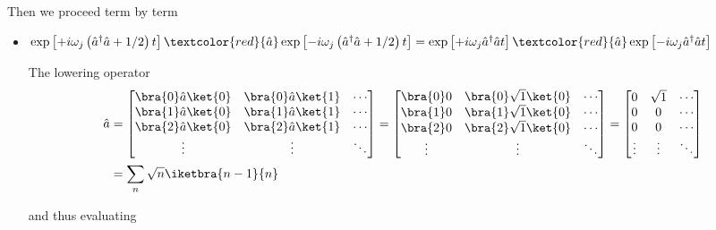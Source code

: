 \noindent Then we proceed term by term
\begin{itemize}
\item
  $\exp\left[+i\omega_j\left(\hat{a}^\dagger\hat{a}+{1}/{2}\right)t\right]\textcolor{red}{\hat{a}}\exp\left[-i\omega_j\left(\hat{a}^\dagger\hat{a}+{1}/{2}\right)t\right]
  =
  \exp\left[+i\omega_j\hat{a}^\dagger\hat{a}t\right]\textcolor{red}{\hat{a}}\exp\left[-i\omega_j\hat{a}^\dagger\hat{a}t\right]$

  The lowering operator \textcolor{red}{
    \begin{equation}
      \begin{aligned}
        \hat{a} & =
        \begin{bmatrix}
          \bra{0}\hat{a}\ket{0} & \bra{0}\hat{a}\ket{1} & \cdots\\
          \bra{1}\hat{a}\ket{0} & \bra{1}\hat{a}\ket{1} & \cdots\\
          \bra{2}\hat{a}\ket{0} & \bra{2}\hat{a}\ket{1} & \cdots\\
          \vdots & \vdots & \ddots\\
        \end{bmatrix}
        = \begin{bmatrix}
          \bra{0}0 & \bra{0}\sqrt{1}\ket{0} & \cdots\\
          \bra{1}0 & \bra{1}\sqrt{1}\ket{0} & \cdots\\
          \bra{2}0 & \bra{2}\sqrt{1}\ket{0} & \cdots\\
          \vdots & \vdots & \ddots\\
        \end{bmatrix}
        = \begin{bmatrix}
          0 & \sqrt{1} & \cdots\\
          0 & 0 & \cdots\\
          0 & 0 & \cdots\\
          \vdots & \vdots & \ddots\\
        \end{bmatrix}\\
        & = \sum_n\sqrt{n}\iketbra{n-1}{n}
      \end{aligned}
    \end{equation}}

  \noindent and thus evaluating


\end{itemize}

